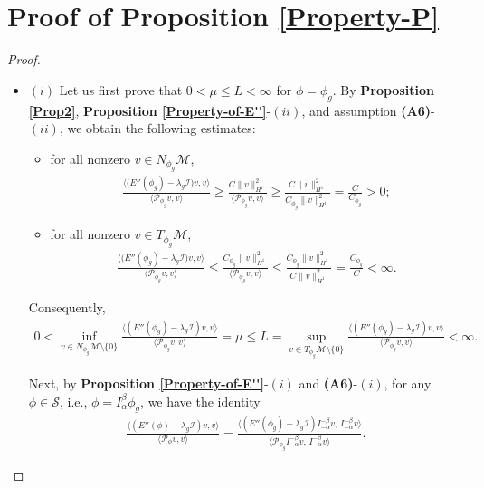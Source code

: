 \documentclass[preprint,3p]{elsarticle}
\begin{document}
\section{Proof of {\bf Proposition }  \ref{Property-P}}\label{Appendix-B}
\begin{proof}
	\begin{itemize}[label={},left=0pt]
		\item $(i)$ Let us first prove that $0 < \mu \le L < \infty$ for $\phi = \phi_g$.  
		By \textbf{Proposition \ref{Prop2}}, \textbf{Proposition \ref{Property-of-E''}}-$(ii)$, and assumption \textbf{(A6)}-$(ii)$, we obtain the following estimates:
		
		\begin{itemize}
			\item for all nonzero $v \in N_{\phi_g}\mathcal{M}$,
			\begin{align*}
				\frac{\big\langle \big(E''(\phi_g)-\lambda_g\mathcal{I}\big)v,v\big\rangle}{\big\langle\mathcal{P}_{\phi_g}v,v\big\rangle}
				\ge \frac{C\|v\|_{H^1}^2}{\langle\mathcal{P}_{\phi_g}v,v\rangle}
				\ge \frac{C\|v\|_{H^1}^2}{C_{\phi_g}\|v\|_{H^1}^2}
				= \frac{C}{C_{\phi_g}} > 0;
			\end{align*}
			
			\item for all nonzero $v \in T_{\phi_g}\mathcal{M}$,
			\begin{align*}
				\frac{\big\langle \big(E''(\phi_g)-\lambda_g\mathcal{I}\big)v,v\big\rangle}{\big\langle\mathcal{P}_{\phi_g}v,v\big\rangle}
				\le \frac{C_{\phi_g}\|v\|_{H^1}^2}{\langle\mathcal{P}_{\phi_g}v,v\rangle}
				\le \frac{C_{\phi_g}\|v\|_{H^1}^2}{C\|v\|_{H^1}^2}
				= \frac{C_{\phi_g}}{C} < \infty.
			\end{align*}
		\end{itemize}
		 Consequently,
			\begin{align*}
				0 < \inf_{v \in N_{\phi_g}\mathcal{M} \setminus \{0\}} 
				\frac{\big\langle (E''(\phi_g) - \lambda_g \mathcal{I}) v, v \big\rangle}{\langle \mathcal{P}_{\phi_g} v, v \rangle}
				= \mu
				\le
				L = \sup_{v \in T_{\phi_g}\mathcal{M} \setminus \{0\}} 
				\frac{\big\langle (E''(\phi_g) - \lambda_g \mathcal{I}) v, v \big\rangle}{\langle \mathcal{P}_{\phi_g} v, v \rangle}
				< \infty.
		\end{align*}
		
		Next, by \textbf{Proposition \ref{Property-of-E''}}-$(i)$ and \textbf{(A6)}-$(i)$, for any $\phi \in \mathcal{S}$, i.e., $\phi = I_\alpha^\beta \phi_g$, we have the identity
		\begin{align*}
			\frac{\big\langle (E''(\phi) - \lambda_g \mathcal{I}) v, v \big\rangle}{\langle \mathcal{P}_\phi v, v \rangle}
			=
			\frac{\big\langle (E''(\phi_g) - \lambda_g \mathcal{I}) I_{-\alpha}^{-\beta} v,\, I_{-\alpha}^{-\beta} v \big\rangle}{\langle \mathcal{P}_{\phi_g} I_{-\alpha}^{-\beta} v,\, I_{-\alpha}^{-\beta} v \rangle}.
		\end{align*}
		

\end{itemize}
\end{proof}
\end{document}
